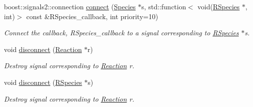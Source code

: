 \begin{DoxyCompactItemize}
boost\-::signals2\-::connection \hyperlink{classchem_1_1ChemSignal_a8d0982d22120c87214c7b9e828fc5aac}{connect} (\hyperlink{classchem_1_1Species}{Species} $\ast$s, std\-::function$<$ void(\hyperlink{classchem_1_1RSpecies}{R\-Species} $\ast$, int)$>$ const \&R\-Species\-\_\-callback, int priority=10)
\begin{DoxyCompactList}\small\item\em Connect the callback, R\-Species\-\_\-callback to a signal corresponding to \hyperlink{classchem_1_1RSpecies}{R\-Species} $\ast$s. \end{DoxyCompactList}\item 
void \hyperlink{classchem_1_1ChemSignal_a161fb76abf1e3d36d4b9c6d655cd2a19}{disconnect} (\hyperlink{classchem_1_1Reaction}{Reaction} $\ast$r)
\begin{DoxyCompactList}\small\item\em Destroy signal corresponding to \hyperlink{classchem_1_1Reaction}{Reaction} r. \end{DoxyCompactList}\item 
void \hyperlink{classchem_1_1ChemSignal_a546b0feb4e8a50ae0e3833ede8d9faee}{disconnect} (\hyperlink{classchem_1_1RSpecies}{R\-Species} $\ast$s)
\begin{DoxyCompactList}\small\item\em Destroy signal corresponding to \hyperlink{classchem_1_1Reaction}{Reaction} r. \end{DoxyCompactList}\end{DoxyCompactItemize}
